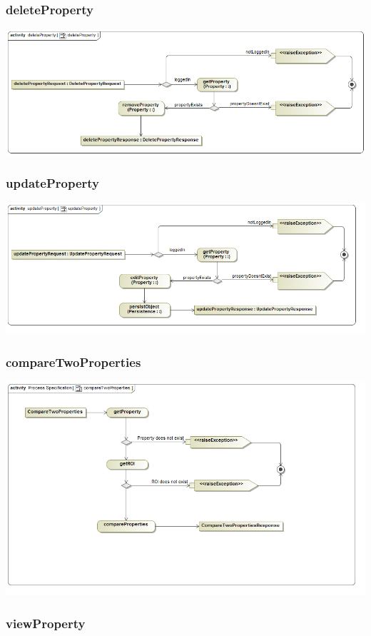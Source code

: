 \documentclass[a4paper,12pt]{article}
\begin{document}
\subsubsection{deleteProperty}
\includegraphics[width=1\textwidth]{./Images/processSpecification/deleteProperty.png}
\subsubsection{updateProperty}
\includegraphics[width=1\textwidth]{./Images/processSpecification/updateProperty.png}
\subsubsection{compareTwoProperties}
\includegraphics[width=1\textwidth]{./Images/processSpecification/compareTwoProperties.png}
\subsubsection{viewProperty}
\end{document}

